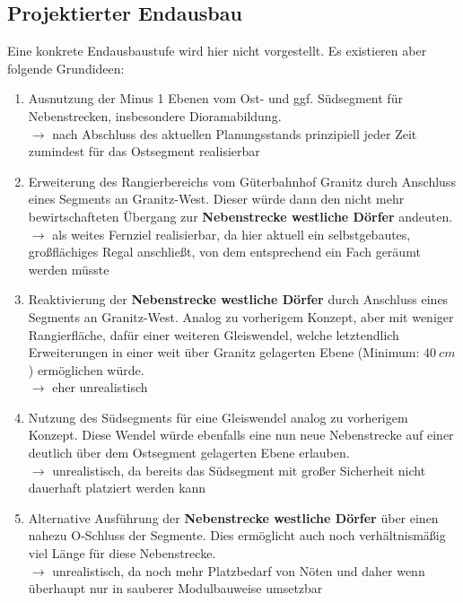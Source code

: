 \subsection{Projektierter Endausbau}
\label{sec:map_final_projected}

Eine konkrete Endausbaustufe wird hier nicht vorgestellt.
Es existieren aber folgende Grundideen:
\begin{enumerate}
	\item Ausnutzung der Minus 1 Ebenen vom Ost- und ggf. S\"udsegment f\"ur Nebenstrecken, insbesondere Dioramabildung.\\
	$\rightarrow$ nach Abschluss des aktuellen Planungsstands prinzipiell jeder Zeit zumindest f\"ur das Ostsegment realisierbar
	\item Erweiterung des Rangierbereichs vom G\"uterbahnhof Granitz durch Anschluss eines Segments an Granitz-West.
	Dieser w\"urde dann den nicht mehr bewirtschafteten \"Ubergang zur \textbf{Nebenstrecke westliche D\"orfer} andeuten.\\
	$\rightarrow$ als weites Fernziel realisierbar, da hier aktuell ein selbstgebautes, gro{\ss}fl\"achiges Regal anschlie{\ss}t, von dem entsprechend ein Fach ger\"aumt werden m\"usste
	\item Reaktivierung der \textbf{Nebenstrecke westliche D\"orfer} durch Anschluss eines Segments an Granitz-West.
	Analog zu vorherigem Konzept, aber mit weniger Rangierfl\"ache, daf\"ur einer weiteren Gleiswendel, welche letztendlich Erweiterungen in einer weit \"uber Granitz gelagerten Ebene (Minimum: $40~cm$) erm\"oglichen w\"urde.\\
	$\rightarrow$ eher unrealistisch
	\item Nutzung des S\"udsegments f\"ur eine Gleiswendel analog zu vorherigem Konzept.
	Diese Wendel w\"urde ebenfalls eine nun neue Nebenstrecke auf einer deutlich \"uber dem Ostsegment gelagerten Ebene erlauben.\\
	$\rightarrow$ unrealistisch, da bereits das S\"udsegment mit gro{\ss}er Sicherheit nicht dauerhaft platziert werden kann
	\item Alternative Ausf\"uhrung der \textbf{Nebenstrecke westliche D\"orfer} \"uber einen nahezu O-Schluss der Segmente.
	Dies erm\"oglicht auch noch verh\"altnism\"a{\ss}ig viel L\"ange f\"ur diese Nebenstrecke.\\
	$\rightarrow$ unrealistisch, da noch mehr Platzbedarf von N\"oten und daher wenn \"uberhaupt nur in sauberer Modulbauweise umsetzbar
\end{enumerate}

